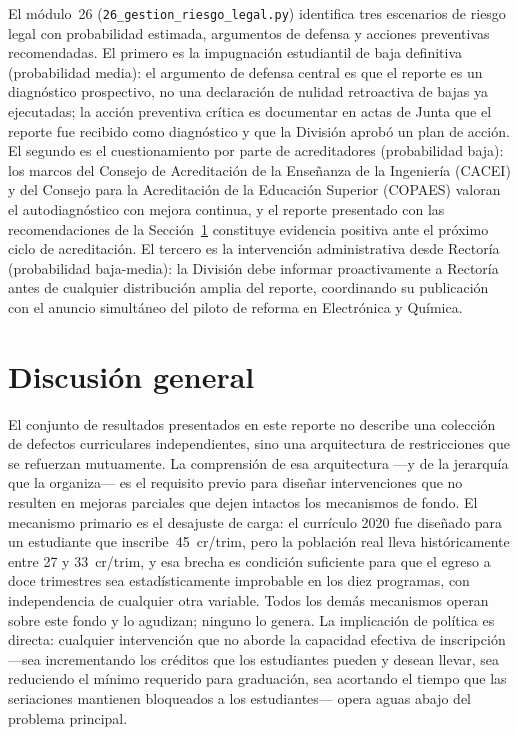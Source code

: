 \documentclass[11pt,letterpaper]{article}
\begin{document}
El módulo~26 (\texttt{26\_gestion\_riesgo\_legal.py}) identifica tres escenarios
de riesgo legal con probabilidad estimada, argumentos de defensa y acciones
preventivas recomendadas.
El primero es la impugnación estudiantil de baja definitiva (probabilidad media):
el argumento de defensa central es que el reporte es un diagnóstico prospectivo,
no una declaración de nulidad retroactiva de bajas ya ejecutadas; la acción
preventiva crítica es documentar en actas de Junta que el reporte fue recibido
como diagnóstico y que la División aprobó un plan de acción.
El segundo es el cuestionamiento por parte de acreditadores (probabilidad baja):
los marcos del Consejo de Acreditación de la Enseñanza de la Ingeniería (CACEI) y del Consejo para la Acreditación de la Educación Superior (COPAES) valoran el autodiagnóstico con mejora continua, y el
reporte presentado con las recomendaciones de la Sección~\ref{sec:discusion}
constituye evidencia positiva ante el próximo ciclo de acreditación.
El tercero es la intervención administrativa desde Rectoría (probabilidad
baja-media): la División debe informar proactivamente a Rectoría antes de cualquier
distribución amplia del reporte, coordinando su publicación con el anuncio
simultáneo del piloto de reforma en Electrónica y Química.



\section{Discusión general}
\label{sec:discusion}

El conjunto de resultados presentados en este reporte no describe una colección de defectos
curriculares independientes, sino una arquitectura de restricciones que se refuerzan mutuamente.
La comprensión de esa arquitectura ---y de la jerarquía que la organiza--- es el requisito
previo para diseñar intervenciones que no resulten en mejoras parciales que dejen intactos los
mecanismos de fondo.
El mecanismo primario es el desajuste de carga: el currículo 2020 fue diseñado para un
estudiante que inscribe~45~cr/trim, pero la población real lleva históricamente entre 27 y
33~cr/trim, y esa brecha es condición suficiente para que el egreso a doce trimestres sea
estadísticamente improbable en los diez programas, con independencia de cualquier otra
variable.
Todos los demás mecanismos operan sobre este fondo y lo agudizan; ninguno lo genera.
La implicación de política es directa: cualquier intervención que no aborde la capacidad
efectiva de inscripción ---sea incrementando los créditos que los estudiantes pueden y desean
llevar, sea reduciendo el mínimo requerido para graduación, sea acortando el tiempo que
las seriaciones mantienen bloqueados a los estudiantes--- opera aguas abajo del problema
principal.
\end{document}
